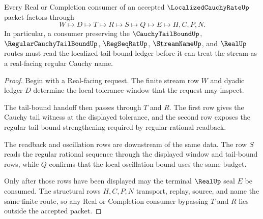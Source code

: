 \begin{theorem}
\label{thm:localized-cauchy-rate-real-completion-handoff}
Every Real or Completion consumer of an accepted $\LocalizedCauchyRateUp$ packet factors through
$$
W \longmapsto D \longmapsto T \longmapsto R \longmapsto S \longmapsto Q \longmapsto E \longmapsto H,C,P,N .
$$
In particular, a consumer preserving the $\CauchyTailBoundUp$, $\RegularCauchyTailBoundUp$, $\RegSeqRatUp$, $\StreamNameUp$, and $\RealUp$ routes must read the localized tail-bound ledger before it can treat the stream as a real-facing regular Cauchy name.
\end{theorem}
\begin{proof}
Begin with a Real-facing request. The finite stream row $W$ and dyadic ledger $D$ determine the local tolerance window that the request may inspect.

The tail-bound handoff then passes through $T$ and $R$. The first row gives the Cauchy tail witness at the displayed tolerance, and the second row exposes the regular tail-bound strengthening required by regular rational readback.

The readback and oscillation rows are downstream of the same data. The row $S$ reads the regular rational sequence through the displayed window and tail-bound rows, while $Q$ confirms that the local oscillation bound uses the same budget.

Only after those rows have been displayed may the terminal $\RealUp$ seal $E$ be consumed. The structural rows $H,C,P,N$ transport, replay, source, and name the same finite route, so any Real or Completion consumer bypassing $T$ and $R$ lies outside the accepted packet.
\end{proof}



